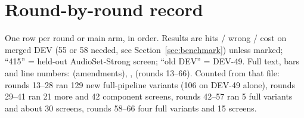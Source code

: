 \section{Round-by-round record}\label{app:rounds}
One row per round or main arm, in order. Results are hits / wrong / cost on merged DEV (55 or 58 needed, see
Section~\ref{sec:benchmark}) unless marked; ``415'' = held-out AudioSet-Strong screen; ``old DEV'' = DEV-49. Full text,
bars and line numbers:  (amendments), ,
 (rounds 13--66). Counted from that file: rounds 13--28 ran 129 new
full-pipeline variants (106 on DEV-49 alone), rounds 29--41 ran 21 more and 42 component screens, rounds 42--57 ran 5
full variants and about 30 screens, rounds 58--66 four full variants and 15 screens.


